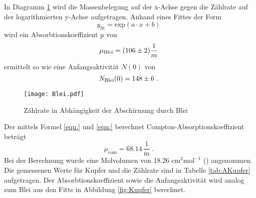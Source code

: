 In Diagramm \ref{fig:Blei} wird die Massenbelegung auf der x-Achse gegen die Zählrate auf der logarithmierten y-Achse aufgetragen. Anhand eines Fittes der Form
\begin{equation}
  y_\text{fit} = \text{exp}(a \cdot x + b)
  \label{eqn:fit}
\end{equation}
wird ein Absorbtionskoeffizient µ von
\begin{equation}
  \mu_\text{Blei} = (\num{106 +- 2}) \frac{1}{m}
  \label{eqn:absK}
\end{equation}
ermittelt so wie eine Anfangsaktivität $N(0)$ von
\begin{equation}
  N_\text{Blei}(0) = \num{148 +- 6} \ .
  \label{eqn:NBlei}
\end{equation}
\begin{figure}
  \centering
  \texttt{[image: Blei.pdf]}
  \caption{Zählrate in Abhängigkeit der Abschirmung durch Blei}
  \label{fig:Blei}
\end{figure}
Der mittels Formel \ref{eqn:} und \ref{eqn:} berechnet Compton-Absorptionskoeffizient beträgt
\begin{equation}
  \mu_\text{com} = 68.14 \, \frac{1}{\text{m}} \ .
  \label{eqn:}
\end{equation}
Bei der Berechnung wurde eine Molvolumen von 18.26 $\text{cm}^3\text{mol}^{-1}$ (\cite{Kupfer}) angenommen.
Die gemessenen Werte für Kupfer und die Zählrate sind in Tabelle \ref{tab:AKupfer} aufgetragen. Der Absorbtionskoeffizient sowie die Anfangsaktivität wird analog zum Blei aus den Fitts in Abbildung \ref{fig:Kupfer} berechnet.
